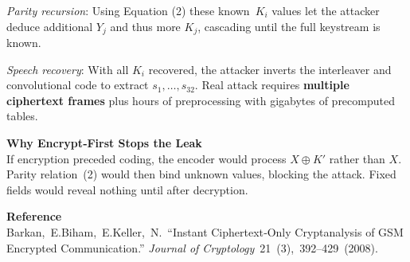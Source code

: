 \begin{technical}
\textit{Parity recursion}: Using Equation (2) these known~\(K_i\) values let the
attacker deduce additional \(Y_j\) and thus more \(K_j\), cascading until
the full keystream is known.

\textit{Speech recovery}: With all \(K_i\) recovered, the attacker inverts
the interleaver and convolutional code to extract \(s_1,\dots,s_{32}\).
Real attack requires \textbf{multiple ciphertext frames} plus hours of preprocessing with gigabytes of precomputed tables.

\noindent\textbf{Why Encrypt‑First Stops the Leak}\\[0.5em]
If encryption preceded coding, the encoder would process \(X \oplus K'\) rather than \(X\).
Parity relation (2) would then bind unknown values, blocking the attack. Fixed
fields would reveal nothing until after decryption.

\noindent\textbf{Reference}\\[0.3em]
{\small
Barkan, E.\;Biham, E.\;Keller, N.\ “Instant Ciphertext‑Only Cryptanalysis of GSM Encrypted Communication.” \textit{Journal of Cryptology} 21 (3), 392–429 (2008).}
\end{technical}
